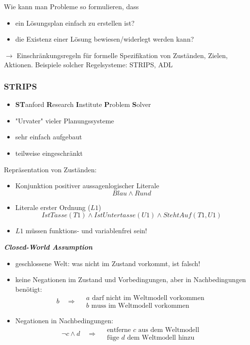 Wie kann man Probleme so formulieren, dass
\begin{itemize}
\item ein Lösungsplan einfach zu erstellen ist?
\item die Existenz einer Lösung bewiesen/widerlegt werden kann?
\end{itemize}
$\to$ Einschränkungsregeln für formelle Spezifikation von Zuständen, Zielen, Aktionen. Beispiele solcher Regelsysteme: STRIPS, ADL

\subsubsection*{STRIPS}

\begin{itemize}
\item \textbf{ST}anford \textbf{R}esearch \textbf{I}nstitute \textbf{P}roblem \textbf{S}olver
\item "{}Urvater"{} vieler Planungssysteme
\item sehr einfach aufgebaut
\item teilweise eingeschränkt
\end{itemize}
Repräsentation von Zuständen:
\begin{itemize}
\item Konjunktion positiver aussagenlogischer Literale $$Blau \wedge Rund$$
\item Literale erster Ordnung ($L1$) $$IstTasse(T1) \wedge IstUntertasse(U1) \wedge StehtAuf(T1,U1)$$
\item $L1$ müssen funktions- und variablenfrei sein!
\end{itemize}
\textbf{\textsl{Closed-World Assumption}}
\begin{itemize}
\item geschlossene Welt: was nicht im Zustand vorkommt, ist falsch!
\item keine Negationen im Zustand und Vorbedingungen, aber in Nachbedingungen benötigt:
$$b \quad \Rightarrow \quad \begin{array}{l} a \textrm{ darf nicht im Weltmodell vorkommen} \\ b \textrm{ muss im Weltmodell vorkommen} \end{array}$$
\item Negationen in Nachbedingungen:
$$\neg c \wedge d \quad \Rightarrow \quad \begin{array}{l} \textrm{entferne } c \textrm{ aus dem Weltmodell} \\ \textrm{füge } d \textrm{ dem Weltmodell hinzu} \end{array}$$
\end{itemize}
